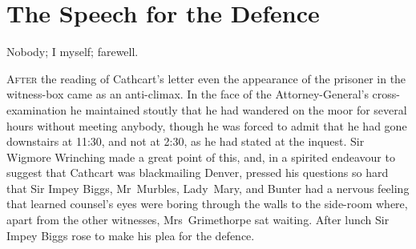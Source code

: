 

\chapter{The Speech for the Defence}

\epigraph{Nobody; I myself; farewell.}{}


\lettrine{A}{fter} the reading of Cathcart's letter even the appearance of the prisoner in the witness-box came as an anti-climax. In the face of the Attorney-General's cross-examination he maintained stoutly that he had wandered on the moor for several hours without meeting anybody, though he was forced to admit that he had gone downstairs at 11:30, and not at 2:30, as he had stated at the inquest. Sir Wigmore Wrinching made a great point of this, and, in a spirited endeavour to suggest that Cathcart was blackmailing Denver, pressed his questions so hard that Sir Impey Biggs, Mr~Murbles, Lady~Mary, and Bunter had a nervous feeling that learned counsel's eyes were boring through the walls to the side-room where, apart from the other witnesses, Mrs~Grimethorpe sat waiting. After lunch Sir Impey Biggs rose to make his plea for the defence.

